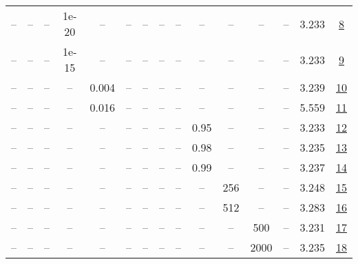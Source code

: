 \begin{table}[H]
\begin{tabular}{ccccccccccccccc}
-- & -- & -- & 1e-20 & -- & -- & -- & -- & -- & -- & -- & -- & -- & 3.233 & \href{https://wandb.ai/stanford-mercury/optimizer-scaling/runs/sweep-300m-6B-soape17abf2lr0.008-wd0.1-minlr0-warmup1000-b10.95--7c7bf8}{8} \\
-- & -- & -- & 1e-15 & -- & -- & -- & -- & -- & -- & -- & -- & -- & 3.233 & \href{https://wandb.ai/stanford-mercury/optimizer-scaling/runs/sweep-300m-6B-soape50b1f7lr0.008-wd0.1-minlr0-warmup1000-b10.95--3af6e1}{9} \\
-- & -- & -- & -- & 0.004 & -- & -- & -- & -- & -- & -- & -- & -- & 3.239 & \href{https://wandb.ai/stanford-mercury/optimizer-scaling/runs/sweep-300m-6B-soape061dfclr0.004-wd0.1-minlr0-warmup1000-b10.95--018deb}{10} \\
-- & -- & -- & -- & 0.016 & -- & -- & -- & -- & -- & -- & -- & -- & 5.559 & \href{https://wandb.ai/stanford-mercury/optimizer-scaling/runs/sweep-300m-6B-soape7e3563lr0.016-wd0.1-minlr0-warmup1000-b10.95--40c60b}{11} \\
-- & -- & -- & -- & -- & -- & -- & -- & -- & 0.95 & -- & -- & -- & 3.233 & \href{https://wandb.ai/stanford-mercury/optimizer-scaling/runs/sweep-300m-6B-soape25236blr0.008-wd0.1-minlr0-warmup1000-b10.95--dbd1b7}{12} \\
-- & -- & -- & -- & -- & -- & -- & -- & -- & 0.98 & -- & -- & -- & 3.235 & \href{https://wandb.ai/stanford-mercury/optimizer-scaling/runs/sweep-300m-6B-soapef3648blr0.008-wd0.1-minlr0-warmup1000-b10.95--cf19b4}{13} \\
-- & -- & -- & -- & -- & -- & -- & -- & -- & 0.99 & -- & -- & -- & 3.237 & \href{https://wandb.ai/stanford-mercury/optimizer-scaling/runs/sweep-300m-6B-soapedb7dddlr0.008-wd0.1-minlr0-warmup1000-b10.95--c19b93}{14} \\
-- & -- & -- & -- & -- & -- & -- & -- & -- & -- & 256 & -- & -- & 3.248 & \href{https://wandb.ai/stanford-mercury/optimizer-scaling/runs/sweep-300m-6B-soapef80782lr0.008-wd0.1-minlr0-warmup1000-b10.95--c17c71}{15} \\
-- & -- & -- & -- & -- & -- & -- & -- & -- & -- & 512 & -- & -- & 3.283 & \href{https://wandb.ai/stanford-mercury/optimizer-scaling/runs/sweep-300m-6B-soape026546lr0.008-wd0.1-minlr0-warmup1000-b10.95--4f8aad}{16} \\
-- & -- & -- & -- & -- & -- & -- & -- & -- & -- & -- & 500 & -- & 3.231 & \href{https://wandb.ai/stanford-mercury/optimizer-scaling/runs/sweep-300m-6B-soape8f4696lr0.008-wd0.1-minlr0-warmup500-b10.95-b-2e6627}{17} \\
-- & -- & -- & -- & -- & -- & -- & -- & -- & -- & -- & 2000 & -- & 3.235 & \href{https://wandb.ai/stanford-mercury/optimizer-scaling/runs/sweep-300m-6B-soape0d086clr0.008-wd0.1-minlr0-warmup2000-b10.95--58d115}{18} \\

\end{tabular}
\end{table}
